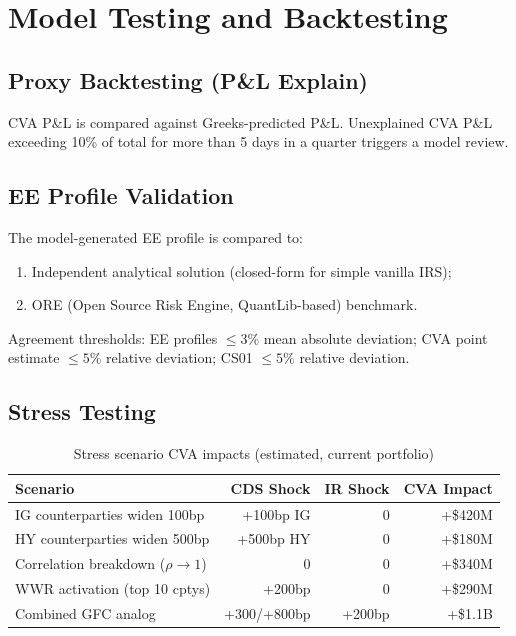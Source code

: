 \documentclass[11pt,a4paper]{article}
\begin{document}
\section{Model Testing and Backtesting}

\subsection{Proxy Backtesting (P\&L Explain)}

CVA P\&L is compared against Greeks-predicted P\&L. Unexplained CVA P\&L
exceeding 10\% of total for more than 5 days in a quarter triggers a model
review.

\subsection{EE Profile Validation}

The model-generated EE profile is compared to:
\begin{enumerate}[noitemsep]
  \item Independent analytical solution (closed-form for simple vanilla IRS);
  \item ORE (Open Source Risk Engine, QuantLib-based) benchmark.
\end{enumerate}

Agreement thresholds: EE profiles $\leq 3\%$ mean absolute deviation; CVA
point estimate $\leq 5\%$ relative deviation; CS01 $\leq 5\%$ relative
deviation.

\subsection{Stress Testing}

\begin{table}[h!]
\centering
\begin{tabular}{@{}lrrr@{}}
\toprule
\textbf{Scenario} & \textbf{CDS Shock} & \textbf{IR Shock} & \textbf{CVA Impact} \\
\midrule
IG counterparties widen 100bp  & +100bp IG  & 0      & +\$420M \\
HY counterparties widen 500bp  & +500bp HY  & 0      & +\$180M \\
Correlation breakdown ($\rho \to 1$) & 0    & 0      & +\$340M \\
WWR activation (top 10 cptys)  & +200bp     & 0      & +\$290M \\
Combined GFC analog            & +300/+800bp & +200bp & +\$1.1B \\
\bottomrule
\end{tabular}
\caption{Stress scenario CVA impacts (estimated, current portfolio)}
\end{table}
\end{document}

